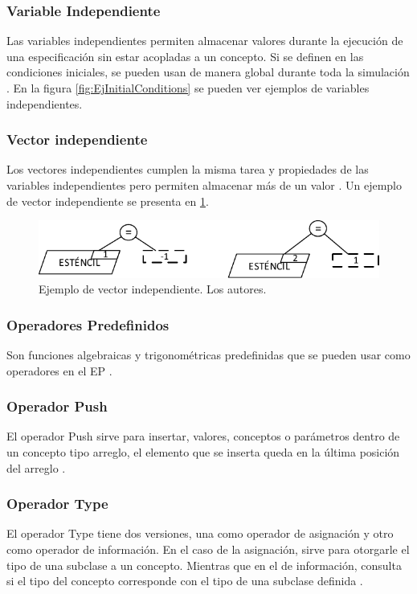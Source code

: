 \subsubsection{Variable Independiente}
Las variables independientes permiten almacenar valores durante la ejecución de una especificación sin estar acopladas a un concepto. Si se definen en las condiciones iniciales, se pueden usan de manera global durante toda la simulación \citep{norena2018det}. En la figura \ref{fig:EjInitialConditions} se pueden ver ejemplos de variables independientes.\\

\subsubsection{Vector independiente}
Los vectores independientes cumplen la misma tarea y propiedades de las variables independientes pero permiten almacenar más de un valor \citep{norena2018det}. Un ejemplo de vector independiente se presenta en \ref{fig:EjVector}.

\begin{figure}[h]
	\centering%
	\includegraphics[width=0.5\linewidth]{Fig/EjVectorIndependiente.pdf}%
	\caption[Ejemplo de vector independiente.]{Ejemplo de vector independiente. Los autores.} \label{fig:EjVector}
\end{figure}

\subsubsection{Operadores Predefinidos}
Son funciones algebraicas y trigonométricas predefinidas que se pueden usar como operadores en el EP \citep{JCalle}.

\subsubsection{Operador Push}
El operador Push sirve para insertar, valores, conceptos o parámetros dentro de un concepto tipo arreglo, el elemento que se inserta queda en la última posición del arreglo  \citep{JCalle}.
\subsubsection{Operador Type}
El operador Type tiene dos versiones, una como operador de asignación y otro como operador de información. En el caso de la asignación, sirve para otorgarle el tipo de una subclase a un concepto. Mientras que en el de información, consulta si el tipo del concepto corresponde con el tipo de una subclase definida \citep{JCalle}.
